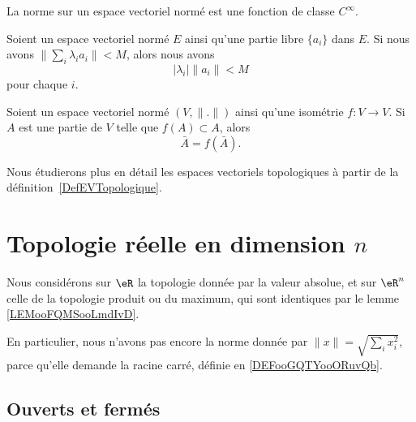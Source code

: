\begin{proposition}     \label{PROPooQUAZooGXskwF}
	La norme sur un espace vectoriel normé est une fonction de classe \(  C^{\infty}\).
\end{proposition}

\begin{lemma}        \label{LEMooGCJEooOAynZW}
	Soient un espace vectoriel normé \( E\) ainsi qu'une partie libre \( \{ a_i \}\) dans \( E\). Si nous avons \( \| \sum_i\lambda_ia_i \|<M\), alors nous avons
	\begin{equation}
		| \lambda_i |\| a_i \|<M
	\end{equation}
	pour chaque \( i\).
\end{lemma}

\begin{lemma}       \label{LEMooSCIIooRyRrHA}
	Soient un espace vectoriel normé \( (V,\| . \|)\) ainsi qu'une isométrie \( f\colon V\to V\). Si \( A\) est une partie de \( V\) telle que \( f(A)\subset A\), alors
	\begin{equation}
		\bar A=f(\bar A).
	\end{equation}
\end{lemma}


Nous étudierons plus en détail les espaces vectoriels topologiques à partir de la définition~\ref{DefEVTopologique}.


\section{Topologie réelle en dimension \( n\)}

Nous considérons sur \( \eR\) la topologie donnée par la valeur absolue, et sur \( \eR^n\) celle de la topologie produit ou du maximum, qui sont identiques par le lemme \ref{LEMooFQMSooLmdIvD}.

En particulier, nous n'avons pas encore la norme donnée par \( \| x \|=\sqrt{ \sum_ix_i^2 }\), parce qu'elle demande la racine carré, définie en \ref{DEFooGQTYooORuvQb}.

\subsection{Ouverts et fermés}

